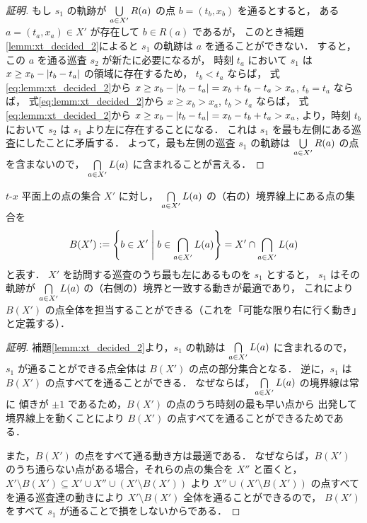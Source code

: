 \begin{proof}[証明]
	もし $s_1$ の軌跡が $\bigcup\limits_{a \in X'} R(a)$ の点 $b = (t_b,x_b)$ を通るとすると，
	ある $a = (t_a,x_a) \in X'$ が存在して $b \in R(a)$ であるが，
	このとき補題\ref{lemm:xt_decided_2}によると
	$s_1$ の軌跡は $a$ を通ることができない．
	すると，この $a$ を通る巡査 $s_2$ が新たに必要になるが，
	時刻 $t_a$ において $s_1$ は $x \geq x_b - |{t_b - t_a}|$ の領域に存在するため，
	$t_b < t_a$ ならば，
	式\ref{eq:lemm:xt_decided_2}から
	$x \geq x_b - |{t_b - t_a}| = x_b + t_b - t_a > x_a$,
	$t_b = t_a$ ならば，
	式\ref{eq:lemm:xt_decided_2}から
	$x \geq x_b > x_a$,
	$t_b > t_a$ ならば，
	式\ref{eq:lemm:xt_decided_2}から
	$x \geq x_b - |{t_b - t_a}| = x_b - t_b + t_a > x_a$,
	より，時刻 $t_b$ において $s_2$ は $s_1$ より左に存在することになる．
	これは $s_1$ を最も左側にある巡査にしたことに矛盾する．
	よって，最も左側の巡査 $s_1$ の軌跡は
	$\bigcup\limits_{a \in X'} R(a)$ の点を含まないので，
	$\bigcap\limits_{a \in X'} L(a)$ に含まれることが言える．
\end{proof}



\begin{lemm}
	\label{lemm:xt_decided_3}
	$t$-$x$ 平面上の点の集合 $X'$ に対し，
	$\bigcap\limits_{a \in X'} L(a)$ の（右の）境界線上にある点の集合を
	\[
		B(X')
		:= \left\{{ b \in X'}\;\middle|\;{ b \in \bigcap_{a \in X'} L(a) }\right\}
		= X' \cap \bigcap_{a \in X'}L(a)
	\]
	と表す．
	$X'$ を訪問する巡査のうち最も左にあるものを $s_1$ とすると，
	$s_1$ はその軌跡が $\bigcap\limits_{a \in X'} L(a)$ の（右側の）境界と一致する動きが最適であり，
	これにより $B(X')$ の点全体を担当することができる（これを「可能な限り右に行く動き」と定義する）．
\end{lemm}


\begin{proof}[証明]
	補題\ref{lemm:xt_decided_2}より，$s_1$ の軌跡は
	$\bigcap\limits_{a \in X'} L(a)$ に含まれるので，
	$s_1$ が通ることができる点全体は
	$B(X')$ の点の部分集合となる．
	逆に，$s_1$ は $B(X')$ の点すべてを通ることができる．
	なぜならば，$\bigcap\limits_{a \in X'} L(a)$ の境界線は常に
	傾きが $\pm 1$ であるため，$B(X')$ の点のうち時刻の最も早い点から
	出発して境界線上を動くことにより
	$B(X')$ の点すべてを通ることができるためである．

	また，$B(X')$ の点をすべて通る動き方は最適である．
	なぜならば，$B(X')$ のうち通らない点がある場合，それらの点の集合を $X''$ と置くと，
	$X' \setminus B(X') \subseteq X' \cup X'' \cup (X' \setminus B(X'))$ より
	$X'' \cup (X' \setminus B(X'))$ の点すべてを通る巡査達の動きにより
	$X' \setminus B(X')$ 全体を通ることができるので，
	$B(X')$ をすべて $s_1$ が通ることで損をしないからである．
\end{proof}


